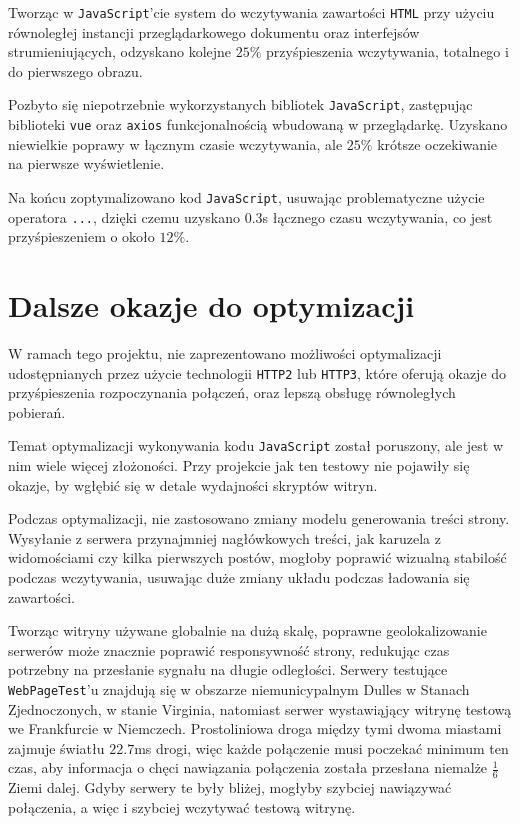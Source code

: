 \documentclass[licencjacka]{pracadypl}
\begin{document}
Tworząc w \texttt{JavaScript}'cie system do wczytywania zawartości \texttt{HTML} przy użyciu równoległej instancji przeglądarkowego dokumentu oraz interfejsów strumieniujących, odzyskano kolejne $25\%$ przyśpieszenia wczytywania, totalnego i do pierwszego obrazu.

Pozbyto się niepotrzebnie wykorzystanych bibliotek \texttt{JavaScript}, zastępując biblioteki \texttt{vue} oraz \texttt{axios} funkcjonalnością wbudowaną w przeglądarkę. Uzyskano niewielkie poprawy w łącznym czasie wczytywania, ale $25\%$ krótsze oczekiwanie na pierwsze wyświetlenie.

Na końcu zoptymalizowano kod \texttt{JavaScript}, usuwając problematyczne użycie operatora \texttt{...}, dzięki czemu uzyskano $0.3$s łącznego czasu wczytywania, co jest przyśpieszeniem \linebreak o około $12\%$.

\section{Dalsze okazje do optymizacji}

W ramach tego projektu, nie zaprezentowano możliwości optymalizacji udostępnianych przez użycie technologii \texttt{HTTP2} lub \texttt{HTTP3}, które oferują okazje do przyśpieszenia rozpoczynania połączeń, oraz lepszą obsługę równoległych pobierań.

Temat optymalizacji wykonywania kodu \texttt{JavaScript} został poruszony, ale jest w nim wiele więcej złożoności. Przy projekcie jak ten testowy nie pojawiły się okazje, by wgłębić się w detale wydajności skryptów witryn.

Podczas optymalizacji, nie zastosowano zmiany modelu generowania treści strony. Wysyłanie z serwera przynajmniej nagłówkowych treści, jak karuzela z widomościami czy kilka pierwszych postów, mogłoby poprawić wizualną stabilość podczas wczytywania, usuwając duże zmiany układu podczas ładowania się zawartości.

Tworząc witryny używane globalnie na dużą skalę, poprawne geolokalizowanie serwerów może znacznie poprawić responsywność strony, redukując czas potrzebny na przesłanie sygnału na długie odległości. Serwery testujące \texttt{WebPageTest}'u znajdują się w obszarze niemunicypalnym Dulles w Stanach Zjednoczonych, w stanie Virginia, natomiast serwer wystawiąjący witrynę testową we Frankfurcie w Niemczech. Prostoliniowa droga między tymi dwoma miastami zajmuje światłu $22.7$ms drogi, więc każde połączenie musi poczekać minimum ten czas, aby informacja o chęci nawiązania połączenia została przesłana niemalże $\frac{1}{6}$ Ziemi dalej. Gdyby serwery te były bliżej, mogłyby szybciej nawiązywać połączenia, a więc i szybciej wczytywać testową witrynę.
\end{document}
